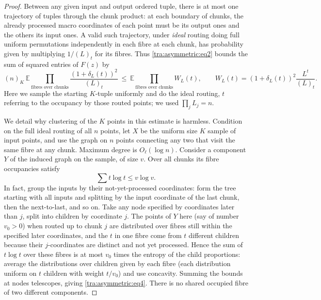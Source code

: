 \begin{proof}
Between any given input and output ordered tuple, there is at most one trajectory of tuples through the chunk product: at each boundary of chunks, the already processed macro coordinates of each point must be its output ones and the others its input ones. A valid such trajectory, under \emph{ideal} routing doing full uniform permutations independently in each fibre at each chunk, has probability given by multiplying \(1/(L)_t\) for its fibres. Thus \eqref{tra:asymmetric:eq2} bounds the sum of squared entries of \(F(z)\) by
\begin{equation}
     (n)_K\ \mathbb E\prod_{\text{fibres over chunks}}
                     \frac{(1+\delta_L(t))^2}{(L)_t}
         \ \le\ \mathbb E\prod_{\text{fibres over chunks}} W_L(t),
         \qquad W_L(t)= (1+\delta_L(t))^2\frac{L^t}{(L)_t}.
                 \label{tra:asymmetric:eq3}
\end{equation}
Here we sample the starting \(K\)-tuple uniformly and do the ideal routing, \(t\) referring to the occupancy by those routed points; we used \(\prod_j L_j=n\).

We detail why clustering of the \(K\) points in this estimate is harmless. Condition on the full ideal routing of all \(n\) points, let \(X\) be the uniform size \(K\) sample of input points, and use the graph on \(n\) points connecting any two that visit the same fibre at any chunk. Maximum degree is \(O_\ell(\log n)\). Consider a component \(Y\) of the induced graph on the sample, of size \(v\). Over all chunks its fibre occupancies satisfy
\begin{equation}
                              \sum t\log t\le v\log v .
                      \label{tra:asymmetric:eq4}
\end{equation}
In fact, group the inputs by their not-yet-processed coordinates: form the tree starting with all inputs and splitting by the input coordinate of the last chunk, then the next-to-last, and so on. Take any node specified by coordinates later than \(j\), split into children by coordinate \(j\). The points of \(Y\) here (say of number \(v_0>0\)) when routed up to chunk \(j\) are distributed over fibres still within the specified later coordinates, and the \(t\) in one fibre come from \(t\) different children because their \(j\)-coordinates are distinct and not yet processed. Hence the sum of \(t\log t\) over these fibres is at most \(v_0\) times the entropy of the child proportions: average the distributions over children given by each fibre (each distribution uniform on \(t\) children with weight \(t/v_0\)) and use concavity. Summing the bounds at nodes telescopes, giving \eqref{tra:asymmetric:eq4}. There is no shared occupied fibre of two different components.


\end{proof}
